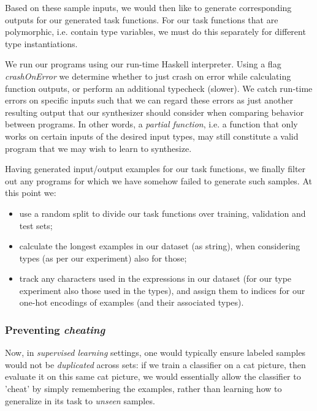 \documentclass{article}
\begin{document}
Based on these sample inputs, we would then like to generate corresponding outputs for our generated task functions.
For our task functions that are polymorphic, i.e. contain type variables,
we must do this separately for different type instantiations.


We run our programs using our run-time Haskell interpreter.
Using a flag \emph{crashOnError} we determine whether to
just crash on error while calculating function outputs,
or perform an additional typecheck (slower).
We catch run-time errors on specific inputs such that
we can regard these errors as just another resulting output
that our synthesizer should consider when comparing behavior between programs.
In other words, a \emph{partial function},
i.e. a function that only works on certain inputs of the desired input types,
may still constitute a valid program that we may wish to learn to synthesize.

Having generated input/output examples for our task functions,
we finally filter out any programs for which we have somehow failed to generate such samples.
At this point we:
\begin{itemize}
    \item use a random split to divide our task functions over training, validation and test sets;
    \item calculate the longest examples in our dataset (as string), when considering types (as per our experiment) also for those;
    \item track any characters used in the expressions in our dataset
    (for our type experiment also those used in the types),
    and assign them to indices for our one-hot encodings of examples (and their associated types).    
\end{itemize}

\subsubsection{Preventing \emph{cheating}}

Now, in \emph{supervised learning} settings,
one would typically ensure labeled samples would not be \emph{duplicated} across sets:
if we train a classifier on a cat picture,
then evaluate it on this same cat picture,
we would essentially allow the classifier to 'cheat' by simply remembering the examples,
rather than learning how to generalize in its task to \emph{unseen} samples.
\end{document}
